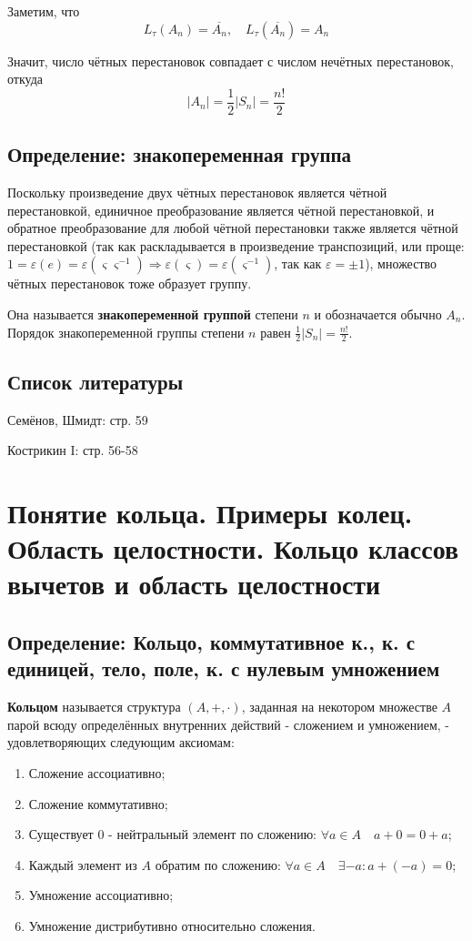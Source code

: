 \documentclass{article}
\begin{document}
Заметим, что 
\[L_\tau(A_n) = \overline{A_n}, \quad L_\tau(\overline{A_n}) = A_n\]

Значит, число чётных перестановок совпадает с числом нечётных перестановок, откуда
\[|A_n| = \frac{1}{2}|S_n| = \frac{n!}{2}\]

\subsection{Определение: знакопеременная группа}

Поскольку произведение двух чётных перестановок является чётной перестановкой, единичное преобразование является чётной перестановкой, и обратное преобразование для любой чётной перестановки также является чётной перестановкой (так как раскладывается в произведение транспозиций, или проще: $1 = \varepsilon(e) = \varepsilon(\varsigma\varsigma^{-1}) \Rightarrow \varepsilon(\varsigma) = \varepsilon(\varsigma^{-1})$, так как $\varepsilon = \pm1$), множество чётных перестановок тоже образует группу.

Она называется \textbf{знакопеременной группой} степени $n$ и обозначается обычно $A_n$. Порядок знакопеременной группы степени $n$ равен $\frac{1}{2}|S_n| = \frac{n!}{2}$.

\subsection*{Список литературы}
Семёнов, Шмидт: стр. 59

Кострикин I: стр. 56-58


\newpage
\section{Понятие кольца. Примеры колец. Область целостности. Кольцо классов вычетов и область целостности}
\subsection{Определение: Кольцо, коммутативное к., к. с единицей, тело, поле, к. с нулевым умножением}
\textbf{Кольцом} называется структура $(A, +, \cdot)$, заданная на некотором множестве $A$ парой всюду определённых внутренних действий - сложением и умножением, - удовлетворяющих следующим аксиомам:
\begin{enumerate}
\item Сложение ассоциативно;
\item Сложение коммутативно;
\item Существует $0$ - нейтральный элемент по сложению: $\forall a \in A \quad a+0 = 0+a$;
\item Каждый элемент из $A$ обратим по сложению: $\forall a \in A \quad \exists -a : a + (-a) = 0$;
\item Умножение ассоциативно;
\item Умножение дистрибутивно относительно сложения.
\end{enumerate}
\end{document}
